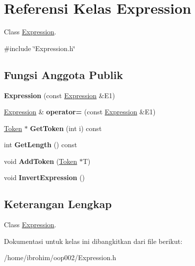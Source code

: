 \hypertarget{classExpression}{}\section{Referensi Kelas Expression}
\label{classExpression}


Class \hyperlink{classExpression}{Expression}.  




{\ttfamily \#include \char`\"{}Expression.\+h\char`\"{}}

\subsection*{Fungsi Anggota Publik}
\begin{DoxyCompactItemize}
\item 
\hypertarget{classExpression_adc6727acfb0cd72c184b6471be928e4a}{}{\bfseries Expression} (const \hyperlink{classExpression}{Expression} \&E1)\label{classExpression_adc6727acfb0cd72c184b6471be928e4a}

\item 
\hypertarget{classExpression_a50017a043b96ee516ed2cafad28bb509}{}\hyperlink{classExpression}{Expression} \& {\bfseries operator=} (const \hyperlink{classExpression}{Expression} \&E1)\label{classExpression_a50017a043b96ee516ed2cafad28bb509}

\item 
\hypertarget{classExpression_a8aff19bc0d16007c40ade71664771e4d}{}\hyperlink{classToken}{Token} $\ast$ {\bfseries Get\+Token} (int i) const \label{classExpression_a8aff19bc0d16007c40ade71664771e4d}

\item 
\hypertarget{classExpression_a0fc88810ca770214d6d221ad711133dd}{}int {\bfseries Get\+Length} () const \label{classExpression_a0fc88810ca770214d6d221ad711133dd}

\item 
\hypertarget{classExpression_a5e3c9fe32872a5c4a13b1188b024d151}{}void {\bfseries Add\+Token} (\hyperlink{classToken}{Token} $\ast$T)\label{classExpression_a5e3c9fe32872a5c4a13b1188b024d151}

\item 
\hypertarget{classExpression_af501343da0390420aebff67c354fd781}{}void {\bfseries Invert\+Expression} ()\label{classExpression_af501343da0390420aebff67c354fd781}

\end{DoxyCompactItemize}


\subsection{Keterangan Lengkap}
Class \hyperlink{classExpression}{Expression}. 

Dokumentasi untuk kelas ini dibangkitkan dari file berikut\+:\begin{DoxyCompactItemize}
\item 
/home/ibrohim/oop002/Expression.\+h\end{DoxyCompactItemize}
